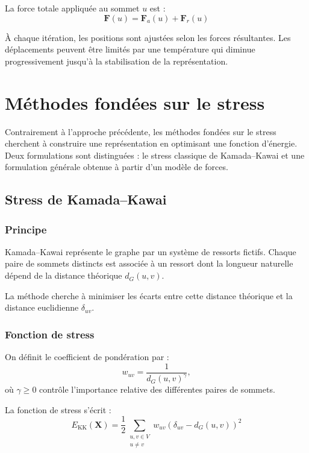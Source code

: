 \documentclass[a4paper,11pt]{article}
\begin{document}
La force totale appliquée au sommet $u$ est :
\[
\boxed{
\mathbf{F}(u)=\mathbf{F}_a(u)+\mathbf{F}_r(u)
}
\]

À chaque itération, les positions sont ajustées selon
les forces résultantes. Les déplacements peuvent être
limités par une température qui diminue progressivement
jusqu'à la stabilisation de la représentation.

\section{Méthodes fondées sur le stress}

Contrairement à l'approche précédente, les méthodes
fondées sur le stress cherchent à construire une
représentation en optimisant une fonction d'énergie.
Deux formulations sont distinguées : le stress classique
de Kamada--Kawai et une formulation générale obtenue
à partir d'un modèle de forces.

\subsection{Stress de Kamada--Kawai}

\subsubsection{Principe}

Kamada--Kawai représente le graphe par un système de
ressorts fictifs. Chaque paire de sommets distincts est
associée à un ressort dont la longueur naturelle dépend
de la distance théorique $d_G(u,v)$.

La méthode cherche à minimiser les écarts entre cette
distance théorique et la distance euclidienne $\delta_{uv}$.

\subsubsection{Fonction de stress}

On définit le coefficient de pondération par :
\[
w_{uv}=\frac{1}{d_G(u,v)^\gamma},
\]
où $\gamma\geq 0$ contrôle l'importance relative des
différentes paires de sommets.

La fonction de stress s'écrit :
\[
\boxed{
E_{\mathrm{KK}}(\mathbf{X})
=
\frac{1}{2}
\sum_{\substack{u,v\in V\\u\neq v}}
w_{uv}
\left(\delta_{uv}-d_G(u,v)\right)^2
}
\]
\end{document}
